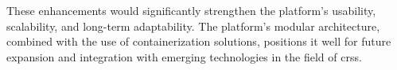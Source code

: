 These enhancements would significantly strengthen the platform's usability, scalability, and long-term adaptability. The platform's modular architecture, combined with the use of containerization solutions, positions it well for future expansion and integration with emerging technologies in the field of \aclp{crs}.
